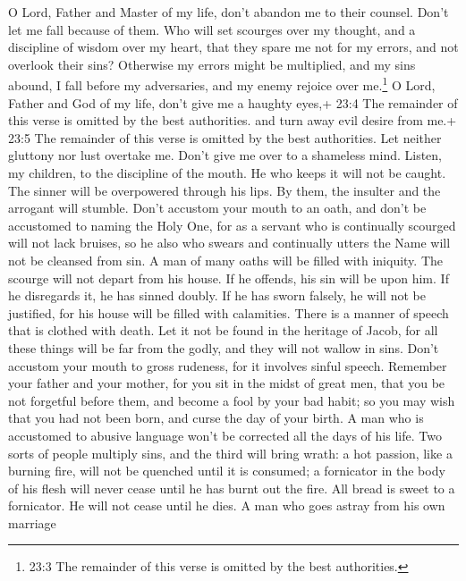  O Lord, Father and Master of my life, don't abandon me to
their counsel. Don't let me fall because of them.  Who will
set scourges over my thought, and a discipline of wisdom over my heart,
that they spare me not for my errors, and not overlook their sins?
 Otherwise my errors might be multiplied, and my sins
abound, I fall before my adversaries, and my enemy rejoice over
me.\footnote{23:3 The remainder of this verse is omitted by the best
  authorities.}  O Lord, Father and God of my life, don't
give me a haughty eyes,+ 23:4 The remainder of this verse is omitted by
the best authorities.  and turn away evil desire from me.+
23:5 The remainder of this verse is omitted by the best authorities.
 Let neither gluttony nor lust overtake me. Don't give me
over to a shameless mind.  Listen, my children, to the
discipline of the mouth. He who keeps it will not be caught.
 The sinner will be overpowered through his lips. By them,
the insulter and the arrogant will stumble.  Don't accustom
your mouth to an oath, and don't be accustomed to naming the Holy One,
 for as a servant who is continually scourged will not lack
bruises, so he also who swears and continually utters the Name will not
be cleansed from sin.  A man of many oaths will be filled
with iniquity. The scourge will not depart from his house. If he
offends, his sin will be upon him. If he disregards it, he has sinned
doubly. If he has sworn falsely, he will not be justified, for his house
will be filled with calamities.  There is a manner of
speech that is clothed with death. Let it not be found in the heritage
of Jacob, for all these things will be far from the godly, and they will
not wallow in sins.  Don't accustom your mouth to gross
rudeness, for it involves sinful speech.  Remember your
father and your mother, for you sit in the midst of great men, that you
be not forgetful before them, and become a fool by your bad habit; so
you may wish that you had not been born, and curse the day of your
birth.  A man who is accustomed to abusive language won't
be corrected all the days of his life.  Two sorts of people
multiply sins, and the third will bring wrath: a hot passion, like a
burning fire, will not be quenched until it is consumed; a fornicator in
the body of his flesh will never cease until he has burnt out the fire.
 All bread is sweet to a fornicator. He will not cease
until he dies.  A man who goes astray from his own marriage
